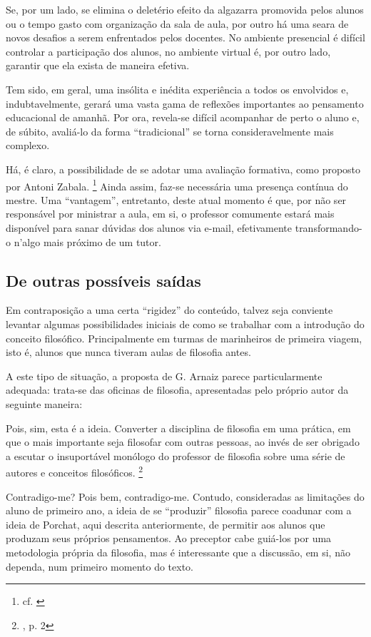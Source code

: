 \documentclass[12pt,a4paper]{article}
\newenvironment{citac}{\begin{addmargin}[4cm]{1em} \footnotesize}{\normalfont \end{addmargin}}
\begin{document}
	Se, por um lado, se elimina o deletério efeito da algazarra 
	promovida pelos alunos ou o tempo gasto com organização da sala de 
	aula, por outro há uma seara de novos desafios a serem enfrentados 
	pelos docentes. No ambiente presencial é difícil controlar a 
	participação dos alunos, no ambiente virtual é, por outro lado, 
	garantir que ela exista de maneira efetiva. 

	Tem sido, em geral, uma insólita e inédita experiência a todos os 
	envolvidos e, indubtavelmente, gerará uma vasta gama de reflexões 
	importantes ao pensamento educacional de amanhã. Por ora, revela-se 
	difícil acompanhar de perto o aluno e, de súbito, avaliá-lo da forma 
	``tradicional'' se torna consideravelmente mais complexo. 

	Há, é claro, a possibilidade de se adotar uma avaliação formativa, 
	como proposto por Antoni Zabala. \footnote{cf. \cite{zabala}}
	Ainda assim, faz-se necessária uma 
	presença contínua do mestre. Uma “vantagem”, entretanto, deste 
	atual momento é que, por não ser responsável por ministrar a aula, 
	em si, o professor comumente estará mais disponível para sanar 
	dúvidas dos alunos via e-mail, efetivamente transformando-o n'algo
	mais próximo de um tutor. 

	\subsection{De outras possíveis saídas}

	Em contraposição a uma certa “rigidez” do conteúdo, talvez seja 
	conviente levantar algumas possibilidades iniciais de como se 
	trabalhar com a introdução do conceito filosófico. Principalmente 
	em turmas de marinheiros de primeira viagem, isto é, alunos que 
	nunca tiveram aulas de filosofia antes. 

	A este tipo de situação, a proposta de G. Arnaiz parece 
	particularmente adequada: trata-se das oficinas de filosofia, 
	apresentadas pelo próprio autor da seguinte maneira: 

	\begin{citac}
		Pois, sim, esta é a ideia. Converter a disciplina de 
		filosofia em uma prática, em que o mais importante seja 
		filosofar com outras pessoas, ao invés de ser obrigado 
		a escutar o insuportável monólogo do professor de 
		filosofia sobre uma série de autores e conceitos 
		filosóficos. 
		\footnote{\cite{arnaiz}, p. 2}
	\end{citac}

	Contradigo-me? Pois bem, contradigo-me. Contudo, consideradas 
	as limitações do aluno de primeiro ano, a ideia de se “produzir”
	filosofia parece coadunar com a ideia de Porchat, aqui descrita 
	anteriormente, de permitir aos alunos que produzam seus próprios 
	pensamentos. Ao preceptor cabe guiá-los por uma metodologia 
	própria da filosofia, mas é interessante que a discussão, em si, 
	não dependa, num primeiro momento do texto. 
\end{document}
